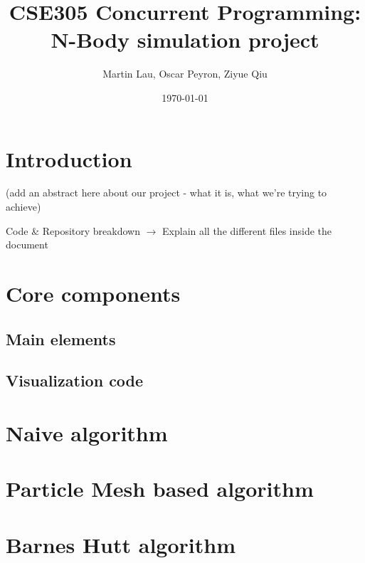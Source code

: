 \documentclass{article}
\title{CSE305 Concurrent Programming: N-Body simulation project}
\author{Martin Lau, Oscar Peyron, Ziyue Qiu}
\date{\today}
\begin{document}
\maketitle

\section{Introduction}
(add an abstract here about our project - what it is, what we're trying to achieve)

Code \& Repository breakdown
$\to$ Explain all the different files inside the document

\section{Core components}
\subsection{Main elements}
\subsection{Visualization code}

\section{Naive algorithm}

\section{Particle Mesh based algorithm}

\section{Barnes Hutt algorithm}
\end{document}
